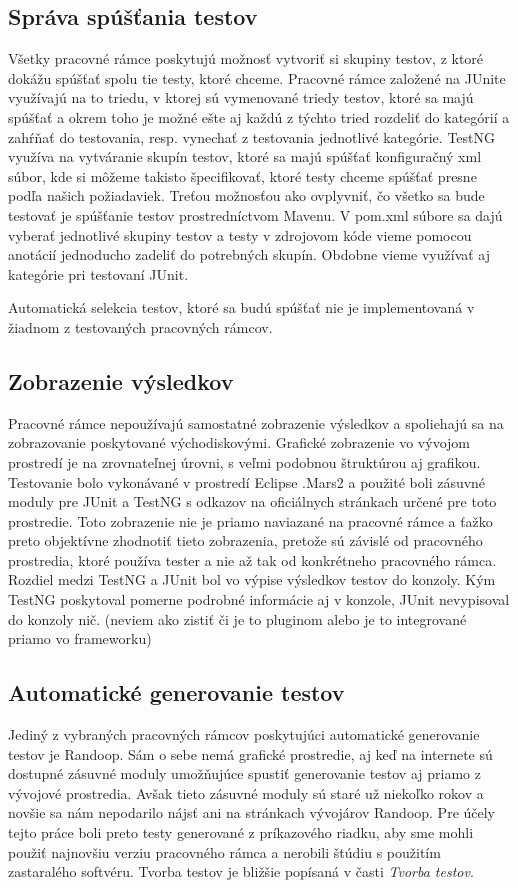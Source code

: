 \documentclass[11pt,twoside,slovak,a4paper]{article}
\begin{document}
	\subsection{Správa spúšťania testov}
	Všetky pracovné rámce poskytujú možnosť vytvoriť si skupiny testov, z ktoré dokážu spúšťať spolu tie testy, ktoré chceme. Pracovné rámce založené na JUnite využívajú na to triedu, v ktorej sú vymenované triedy testov, ktoré sa majú spúšťať a okrem toho je možné ešte aj každú z týchto tried rozdeliť do kategórií a zahŕňať do testovania, resp. vynechať z testovania jednotlivé kategórie.
	TestNG využíva na vytváranie skupín testov, ktoré sa majú spúšťať konfiguračný xml súbor, kde si môžeme takisto špecifikovať, ktoré testy chceme spúšťať presne podľa našich požiadaviek.
	Treťou možnosťou ako ovplyvniť, čo všetko sa bude testovať je spúšťanie testov prostredníctvom Mavenu. V pom.xml súbore sa dajú vyberať jednotlivé skupiny testov a testy v zdrojovom kóde vieme pomocou anotácií jednoducho zadeliť do potrebných skupín. Obdobne vieme využívať aj kategórie pri testovaní JUnit.
	
	Automatická selekcia testov, ktoré sa budú spúšťať nie je implementovaná v žiadnom z testovaných pracovných rámcov.
	
	\subsection{Zobrazenie výsledkov}
	Pracovné rámce nepoužívajú samostatné zobrazenie výsledkov a spoliehajú sa na zobrazovanie poskytované východiskovými. Grafické zobrazenie vo vývojom prostredí je na zrovnateľnej úrovni, s veľmi podobnou štruktúrou aj grafikou. Testovanie bolo vykonávané v prostredí Eclipse .Mars2 a použité boli zásuvné moduly pre JUnit a TestNG s odkazov na oficiálnych stránkach určené pre toto prostredie. Toto zobrazenie nie je priamo naviazané na pracovné rámce a ťažko preto objektívne zhodnotiť tieto zobrazenia, pretože sú závislé od pracovného prostredia, ktoré používa tester a nie až tak od konkrétneho pracovného rámca.
	Rozdiel medzi TestNG a JUnit bol vo výpise výsledkov testov do konzoly. Kým TestNG poskytoval pomerne podrobné informácie aj v konzole, JUnit nevypisoval do konzoly nič. (neviem ako zistiť či je to pluginom alebo je to integrované priamo vo frameworku)
	
	\subsection{Automatické generovanie testov}
	Jediný z vybraných pracovných rámcov poskytujúci automatické generovanie testov je Randoop. Sám o sebe nemá grafické prostredie, aj keď na internete sú dostupné zásuvné moduly umožňujúce spustiť generovanie testov aj priamo z vývojové prostredia. Avšak tieto zásuvné moduly sú staré už niekoľko rokov a novšie sa nám nepodarilo nájsť ani na stránkach vývojárov Randoop. Pre účely tejto práce boli preto testy generované z príkazového riadku, aby sme mohli použiť najnovšiu verziu pracovného rámca a nerobili štúdiu s použitím zastaralého softvéru. Tvorba testov je bližšie popísaná v časti \textit{Tvorba testov}.
	
\end{document}
